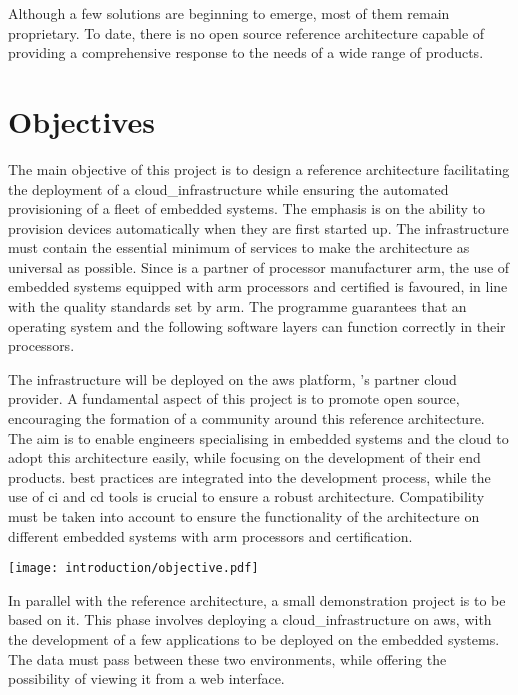 Although a few solutions are beginning to emerge, most of them remain proprietary. To date, there is no open source reference architecture capable of providing a comprehensive response to the needs of a wide range of products.


\section{Objectives}

The main objective of this project is to design a reference architecture facilitating the deployment of a \gls{cloud_infrastructure} while ensuring the automated provisioning of a fleet of embedded systems. The emphasis is on the ability to provision devices automatically when they are first started up. The infrastructure must contain the essential minimum of services to make the architecture as universal as possible. Since  is a partner of processor manufacturer \gls{arm}, the use of embedded systems equipped with \gls{arm} processors and certified  is favoured, in line with the quality standards set by \gls{arm}. The  programme guarantees that an operating system and the following software layers can function correctly in their processors.

The infrastructure will be deployed on the \gls{aws} platform, 's partner \gls{cloud} provider. A fundamental aspect of this project is to promote open source, encouraging the formation of a community around this reference architecture. The aim is to enable engineers specialising in embedded systems and the \gls{cloud} to adopt this architecture easily, while focusing on the development of their end products.  best practices are integrated into the development process, while the use of \acrfull{ci} and \acrfull{cd} tools is crucial to ensure a robust architecture. Compatibility must be taken into account to ensure the functionality of the architecture on different embedded systems with \gls{arm} processors and  certification.
\begin{center}
    \begingroup
    \texttt{[image: introduction/objective.pdf]}
    \label{fig:objective}
    \endgroup
\end{center}
In parallel with the reference architecture, a small demonstration project is to be based on it. This phase involves deploying a \gls{cloud_infrastructure} on \gls{aws}, with the development of a few applications to be deployed on the embedded systems. The data must pass between these two environments, while offering the possibility of viewing it from a web interface.


